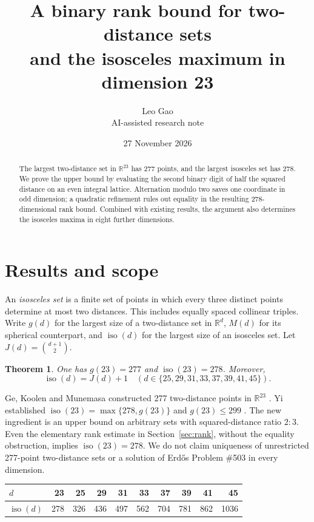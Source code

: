 \documentclass[11pt]{article}
\title{A binary rank bound for two-distance sets\\and the isosceles maximum in dimension 23}
\author{Leo Gao\\[-1pt]\small AI-assisted research note}
\date{27 November 2026}
\newtheorem{theorem}{Theorem}
\newcommand{\RR}{\mathbb R}
\newcommand{\iso}{\operatorname{iso}}
\begin{document}
\maketitle
\begin{abstract}
The largest two-distance set in $\RR^{23}$ has 277 points, and the largest isosceles set has 278. We prove the upper bound by evaluating the second binary digit of half the squared distance on an even integral lattice. Alternation modulo two saves one coordinate in odd dimension; a quadratic refinement rules out equality in the resulting 278-dimensional rank bound. Combined with existing results, the argument also determines the isosceles maxima in eight further dimensions.
\end{abstract}

\section{Results and scope}
An \emph{isosceles set} is a finite set of points in which every three distinct points determine at most two distances. This includes equally spaced collinear triples. Write $g(d)$ for the largest size of a two-distance set in $\RR^d$, $M(d)$ for its spherical counterpart, and $\iso(d)$ for the largest size of an isosceles set. Let $J(d)=\binom{d+1}{2}$.
\begin{theorem}\label{th:main}
One has $g(23)=277$ and $\iso(23)=278$. Moreover,
\[
\iso(d)=J(d)+1\quad(d\in\{25,29,31,33,37,39,41,45\}).
\]
\end{theorem}
Ge, Koolen and Munemasa constructed 277 two-distance points in $\RR^{23}$ \cite{gkm}. Yi established $\iso(23)=\max\{278,g(23)\}$ and $g(23)\le299$ \cite{yi}. The new ingredient is an upper bound on arbitrary sets with squared-distance ratio $2:3$. Even the elementary rank estimate in Section~\ref{sec:rank}, without the equality obstruction, implies $\iso(23)=278$. We do not claim uniqueness of unrestricted 277-point two-distance sets or a solution of Erd\H{o}s Problem \#503 in every dimension.

\begin{center}
\begin{tabular}{lrrrrrrrrr}
\toprule
$d$ & 23 & 25 & 29 & 31 & 33 & 37 & 39 & 41 & 45\\
\midrule
$\iso(d)$ & 278 & 326 & 436 & 497 & 562 & 704 & 781 & 862 & 1036\\
\bottomrule
\end{tabular}
\end{center}
\end{document}
